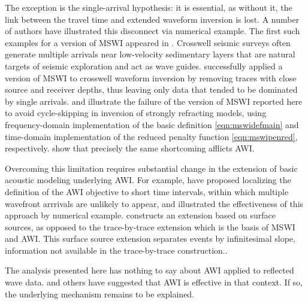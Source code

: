 The exception is the single-arrival hypothesis: it is
essential, as without it, the link between the travel time and
extended waveform inversion is lost.
A number of authors have illustrated this disconnect via numerical
example. The first such examples for a version of MSWI appeared in
\cite{Symes:94c}. Crosswell seismic surveys often generate multiple
arrivals near low-velocity sedimentary layers that are natural targets
of seismic exploration and act as wave guides. \cite{Plessix:00}
successfully applied a version of MSWI to crosswell waveform inversion
by removing traces with close source and receiver depths, thus leaving
only data that tended to be dominated by single arrivals.
\cite{HuangSymes:Geo17} and \cite{SymesChenMinkoff:24} illustrate the
failure of the version of MSWI reported here to avoid cycle-skipping
in inversion of strongly refracting models, using frequency-domain
implementation of the basic definition \ref{eqn:mswidefmain} and
time-domain implementation of the reduced penalty function
\ref{eqn:mswipenred}, respectively. \cite{Yongetal:GJI23} show that
precisely the same shortcoming afflicts AWI.

Overcoming this limitation requires substantial change in the
extension of basic acoustic modeling underlying AWI. For example,
\cite{Yongetal:GJI23} have proposed localizing the definition of the
AWI objective to short time intervals, within which multiple wavefront
arrrivals are unlikely to appear, and illustrated the effectiveness of
this approach by numerical example. \cite{Symes:23} constructs an
extension based on surface sources, as opposed to the trace-by-trace
extension which is the basis of MSWI and AWI. This surface source
extension separates events by infinitesimal slope, information not
available in the trace-by-trace construction..

The analysis presented here has nothing to say about AWI applied to
reflected wave data. \cite{Warner:16} and others have
suggested that AWI is effective in that context. If so, the underlying
mechanism remains to be explained.


